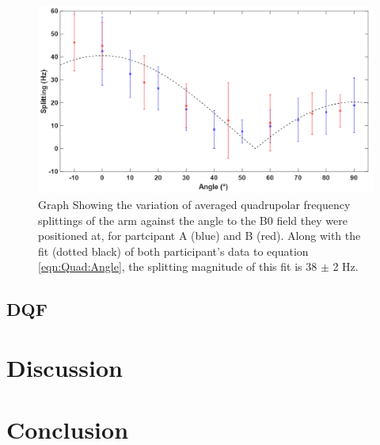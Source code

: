 \documentclass[class=article, crop=false]{standalone}
\begin{document}
\begin{figure}
    \centering
    \includegraphics[width=1\textwidth]{Figures/Quad/Split_Angle_1.png}
    \caption{Graph Showing the variation of averaged quadrupolar frequency splittings of the arm against the angle to the B0 field they were positioned at, for partcipant A (blue) and B (red). Along with the fit (dotted black) of both participant's data to equation \ref{eqn:Quad:Angle}, the splitting magnitude of this fit is 38 $\pm$ 2 Hz.}
    \label{fig:D2O:Split_Angle}
\end{figure}

\subsection{DQF}

\section{Discussion}

\section{Conclusion}

\printbibliography %
\end{document}
